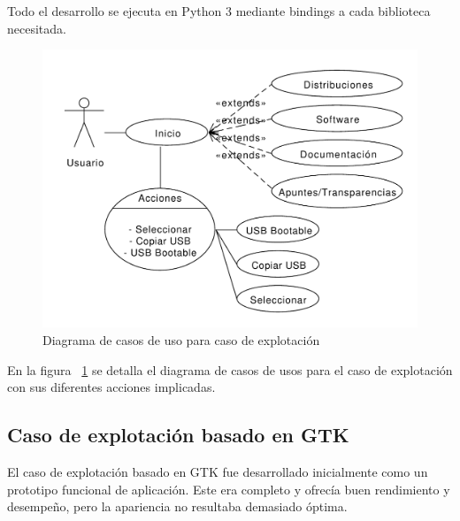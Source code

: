 \newpage Todo el desarrollo se ejecuta en Python 3 mediante
bindings a cada biblioteca necesitada.

\begin{figure}[ht]
    \begin{center}
        \includegraphics[scale=0.6]{src/img/diagrams/study-case-diagram.pdf}
        \caption[Diagrama de 
        casos de uso para caso de explotación]
          {Diagrama de 
        casos de uso para caso de explotación}
        \label{fig:caseusediagram}
    \end{center}
\end{figure}

En la figura ~\ref{fig:caseusediagram} se detalla el diagrama de casos de usos
para el caso de explotación con sus diferentes acciones implicadas.

\newpage

\subsection{Caso de explotación basado en GTK}
\label{sec:casestudygtk}

El caso de explotación basado en GTK fue desarrollado inicialmente como un
prototipo funcional de aplicación. Este era completo y ofrecía buen rendimiento
y desempeño, pero la apariencia no resultaba demasiado óptima.

